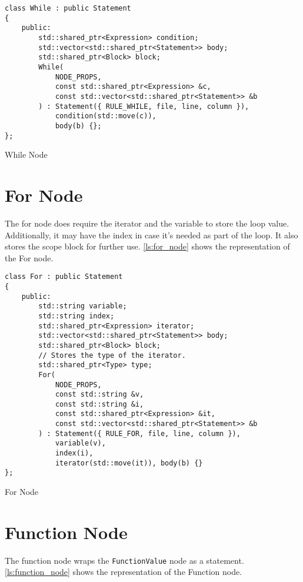 \begin{listing}[H]
\begin{verbatim}
class While : public Statement
{
    public:
        std::shared_ptr<Expression> condition;
        std::vector<std::shared_ptr<Statement>> body;
        std::shared_ptr<Block> block;
        While(
            NODE_PROPS,
            const std::shared_ptr<Expression> &c,
            const std::vector<std::shared_ptr<Statement>> &b
        ) : Statement({ RULE_WHILE, file, line, column }),
            condition(std::move(c)),
            body(b) {};
};
\end{verbatim}
\caption{While Node}
\label{ls:while_node}
\end{listing}

\section{For Node}

The for node does require the iterator and the variable to store the loop value.
Additionally, it may have the index in case it's needed as part of the loop.
It also stores the scope block for further use.
\autoref{ls:for_node} shows the representation of the For node.

\begin{listing}[H]
\begin{verbatim}
class For : public Statement
{
    public:
        std::string variable;
        std::string index;
        std::shared_ptr<Expression> iterator;
        std::vector<std::shared_ptr<Statement>> body;
        std::shared_ptr<Block> block;
        // Stores the type of the iterator.
        std::shared_ptr<Type> type;
        For(
            NODE_PROPS,
            const std::string &v,
            const std::string &i,
            const std::shared_ptr<Expression> &it,
            const std::vector<std::shared_ptr<Statement>> &b
        ) : Statement({ RULE_FOR, file, line, column }),
            variable(v),
            index(i),
            iterator(std::move(it)), body(b) {}
};
\end{verbatim}
\caption{For Node}
\label{ls:for_node}
\end{listing}

\section{Function Node}

The function node wraps the \texttt{FunctionValue} node as a statement.
\autoref{ls:function_node} shows the representation of the Function node.

